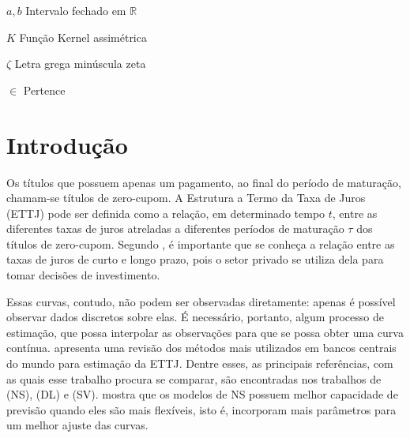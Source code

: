 \documentclass[
	12pt,				%
	openright,			%
	oneside,			%
	a4paper,			%
	english,			%
	brazil				%
	]{dissertacao-ufrgs-abntex2}
\begin{document}
\begin{simbolos}
  \item[$ a,b $] Intervalo fechado em $\mathbb{R}$
  \item[$ K $] Função Kernel assimétrica
  \item[$ \zeta $] Letra grega minúscula zeta
  \item[$ \in $] Pertence
\end{simbolos}

\tableofcontents*
\cleardoublepage



\textual

\chapter*[Introdução]{Introdução}


Os títulos que possuem apenas um pagamento, ao final do período de
maturação, chamam-se títulos de zero-cupom. A Estrutura a Termo da
Taxa de Juros (ETTJ) pode ser definida como a relação, em determinado tempo $t$, entre as diferentes taxas de juros atreladas
a diferentes períodos de maturação $\tau$ dos títulos de zero-cupom.
Segundo , é importante que se conheça a relação
entre as taxas de juros de curto e longo prazo, pois o setor privado
se utiliza dela para tomar decisões de investimento.

Essas curvas, contudo, não podem ser observadas diretamente: apenas é possível
observar dados discretos sobre elas. É necessário, portanto, algum
processo de estimação, que possa interpolar as observações para que
se possa obter uma curva contínua.   apresenta
uma revisão dos métodos mais utilizados em bancos centrais do mundo
para estimação da ETTJ. Dentre esses, as principais referências, com
as quais esse trabalho procura se comparar, são encontradas nos trabalhos 
de (NS), 
(DL) e (SV).
 mostra que os modelos de NS possuem
melhor capacidade de previsão quando eles são mais flexíveis, isto é, incorporam mais parâmetros para um melhor ajuste das curvas.
\end{document}

